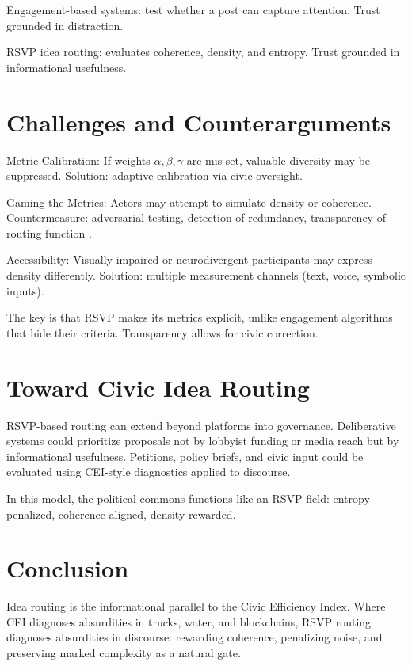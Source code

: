 \documentclass{book}
\begin{document}
Engagement-based systems: test whether a post can capture attention. Trust grounded in distraction.

RSVP idea routing: evaluates coherence, density, and entropy. Trust grounded in informational usefulness.

\section{Challenges and Counterarguments}

Metric Calibration: If weights \( \alpha, \beta, \gamma \) are mis-set, valuable diversity may be suppressed. Solution: adaptive calibration via civic oversight.

Gaming the Metrics: Actors may attempt to simulate density or coherence. Countermeasure: adversarial testing, detection of redundancy, transparency of routing function \cite{szegedy2014}.

Accessibility: Visually impaired or neurodivergent participants may express density differently. Solution: multiple measurement channels (text, voice, symbolic inputs).

The key is that RSVP makes its metrics explicit, unlike engagement algorithms that hide their criteria. Transparency allows for civic correction.

\section{Toward Civic Idea Routing}

RSVP-based routing can extend beyond platforms into governance. Deliberative systems could prioritize proposals not by lobbyist funding or media reach but by informational usefulness. Petitions, policy briefs, and civic input could be evaluated using CEI-style diagnostics applied to discourse.

In this model, the political commons functions like an RSVP field: entropy penalized, coherence aligned, density rewarded.

\section{Conclusion}

Idea routing is the informational parallel to the Civic Efficiency Index. Where CEI diagnoses absurdities in trucks, water, and blockchains, RSVP routing diagnoses absurdities in discourse: rewarding coherence, penalizing noise, and preserving marked complexity as a natural gate.
\end{document}
